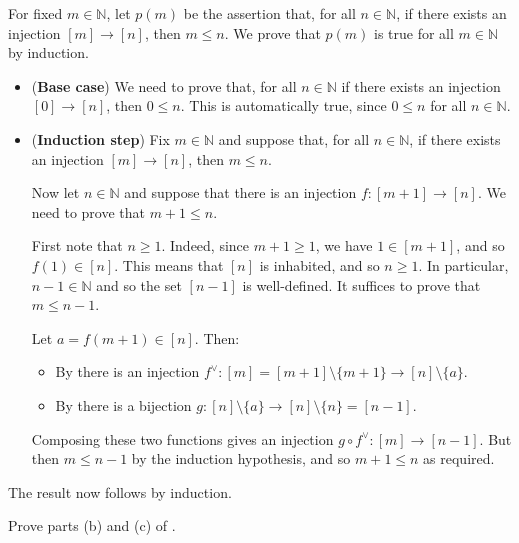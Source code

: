 \begin{cproof}[of (a)]
For fixed $m \in \mathbb{N}$, let $p(m)$ be the assertion that, for all $n \in \mathbb{N}$, if there exists an injection $[m] \to [n]$, then $m \le n$. We prove that $p(m)$ is true for all $m \in \mathbb{N}$ by induction.

\begin{itemize}
\item (\textbf{Base case}) We need to prove that, for all $n \in \mathbb{N}$ if there exists an injection $[0] \to [n]$, then $0 \le n$. This is automatically true, since $0 \le n$ for all $n \in \mathbb{N}$.
\item (\textbf{Induction step}) Fix $m \in \mathbb{N}$ and suppose that, for all $n \in \mathbb{N}$, if there exists an injection $[m] \to [n]$, then $m \le n$.

Now let $n \in \mathbb{N}$ and suppose that there is an injection $f : [m+1] \to [n]$. We need to prove that $m+1 \le n$.

First note that $n \ge 1$. Indeed, since $m+1 \ge 1$, we have $1 \in [m+1]$, and so $f(1) \in [n]$. This means that $[n]$ is inhabited, and so $n \ge 1$. In particular, $n-1 \in \mathbb{N}$ and so the set $[n-1]$ is well-defined. It suffices to prove that $m \le n-1$.

Let $a = f(m+1) \in [n]$. Then:
\begin{itemize}
\item By  there is an injection $f^{\vee} : [m] = [m+1] \setminus \{ m+1 \} \to [n] \setminus \{ a \}$.
\item By  there is a bijection $g : [n] \setminus \{ a \} \to [n] \setminus \{ n \} = [n-1]$.
\end{itemize}

Composing these two functions gives an injection $g \circ f^{\vee} : [m] \to [n-1]$. But then $m \le n-1$ by the induction hypothesis, and so $m+1 \le n$ as required.
\end{itemize}
The result now follows by induction.
\end{cproof}

\begin{exercise}
Prove parts (b) and (c) of .
\end{exercise}

